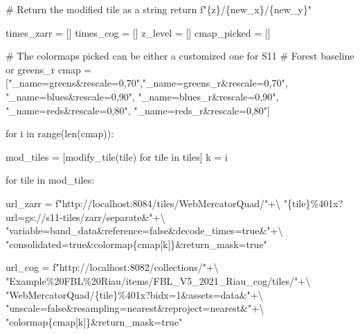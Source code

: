 \documentclass[
  oneside,
  open=any]{scrbook}
\newenvironment{Shaded}{\begin{snugshade}}{\end{snugshade}}
\newcommand{\BuiltInTok}[1]{\textcolor[rgb]{0.00,0.23,0.31}{#1}}
\newcommand{\CommentTok}[1]{\textcolor[rgb]{0.37,0.37,0.37}{#1}}
\newcommand{\ControlFlowTok}[1]{\textcolor[rgb]{0.00,0.23,0.31}{#1}}
\newcommand{\KeywordTok}[1]{\textcolor[rgb]{0.00,0.23,0.31}{#1}}
\newcommand{\NormalTok}[1]{\textcolor[rgb]{0.00,0.23,0.31}{#1}}
\newcommand{\OperatorTok}[1]{\textcolor[rgb]{0.37,0.37,0.37}{#1}}
\newcommand{\SpecialCharTok}[1]{\textcolor[rgb]{0.37,0.37,0.37}{#1}}
\newcommand{\SpecialStringTok}[1]{\textcolor[rgb]{0.13,0.47,0.30}{#1}}
\newcommand{\StringTok}[1]{\textcolor[rgb]{0.13,0.47,0.30}{#1}}
\begin{document}
\begin{Shaded}
\begin{Highlighting}[]
    \CommentTok{\# Return the modified tile as a string}
    \ControlFlowTok{return} \SpecialStringTok{f"}\SpecialCharTok{\{}\NormalTok{z}\SpecialCharTok{\}}\SpecialStringTok{/}\SpecialCharTok{\{}\NormalTok{new\_x}\SpecialCharTok{\}}\SpecialStringTok{/}\SpecialCharTok{\{}\NormalTok{new\_y}\SpecialCharTok{\}}\SpecialStringTok{"}

\NormalTok{times\_zarr }\OperatorTok{=}\NormalTok{ []}
\NormalTok{times\_cog }\OperatorTok{=}\NormalTok{ []}
\NormalTok{z\_level }\OperatorTok{=}\NormalTok{ []}
\NormalTok{cmap\_picked }\OperatorTok{=}\NormalTok{ []}

\CommentTok{\# The colormaps picked can be either a customized one for S11}
\CommentTok{\# Forest baseline or greens\_r}
\NormalTok{cmap }\OperatorTok{=}\NormalTok{ [}\StringTok{"\_name=greens\&rescale=0,70"}\NormalTok{,}\StringTok{"\_name=greens\_r\&rescale=0,70"}\NormalTok{,}
        \StringTok{"\_name=blues\&rescale=0,90"}\NormalTok{, }\StringTok{"\_name=blues\_r\&rescale=0,90"}\NormalTok{,}
        \StringTok{"\_name=reds\&rescale=0,80"}\NormalTok{, }\StringTok{"\_name=reds\_r\&rescale=0,80"}\NormalTok{]}

\ControlFlowTok{for}\NormalTok{ i }\KeywordTok{in} \BuiltInTok{range}\NormalTok{(}\BuiltInTok{len}\NormalTok{(cmap)):}

\NormalTok{    mod\_tiles }\OperatorTok{=}\NormalTok{ [modify\_tile(tile) }\ControlFlowTok{for}\NormalTok{ tile }\KeywordTok{in}\NormalTok{ tiles]}
\NormalTok{    k }\OperatorTok{=}\NormalTok{ i}

    \ControlFlowTok{for}\NormalTok{ tile }\KeywordTok{in}\NormalTok{ mod\_tiles:}

\NormalTok{        url\_zarr }\OperatorTok{=} \SpecialStringTok{f"http://localhost:8084/tiles/WebMercatorQuad/"}\OperatorTok{+\textbackslash{}}
        \StringTok{"}\SpecialCharTok{\{tile\}\%401x}\StringTok{?url=gs://s11{-}tiles/zarr/separate\&"}\OperatorTok{+\textbackslash{}}
        \StringTok{"variable=band\_data\&reference=false\&decode\_times=true\&"}\OperatorTok{+\textbackslash{}}
        \StringTok{"consolidated=true\&colormap}\SpecialCharTok{\{cmap[k]\}}\StringTok{\&return\_mask=true"}

\NormalTok{        url\_cog }\OperatorTok{=} \SpecialStringTok{f"http://localhost:8082/collections/"}\OperatorTok{+\textbackslash{}}
        \StringTok{"Example}\SpecialCharTok{\%20F}\StringTok{BL\%20Riau/items/FBL\_V5\_2021\_Riau\_cog/tiles/"}\OperatorTok{+\textbackslash{}}
        \StringTok{"WebMercatorQuad/}\SpecialCharTok{\{tile\}\%401x}\StringTok{?bidx=1\&assets=data\&"}\OperatorTok{+\textbackslash{}}
        \StringTok{"unscale=false\&resampling=nearest\&reproject=nearest\&"}\OperatorTok{+\textbackslash{}}
        \StringTok{"colormap}\SpecialCharTok{\{cmap[k]\}}\StringTok{\&return\_mask=true"}


\end{Highlighting}
\end{Shaded}
\end{document}
